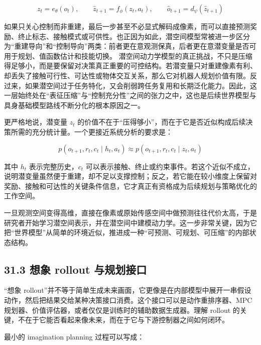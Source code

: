 \begingroup
\scriptsize
\begin{equation*}
z_t = e_\theta(o_t), \qquad \hat{z}_{t+1} = f_\phi(z_t, a_t), \qquad \hat{o}_{t+1} = d_\psi(\hat{z}_{t+1})
\end{equation*}
\endgroup

如果只关心控制而非重建，最后一步甚至不必显式解码成像素，而可以直接预测奖励、终止标志、接触模式或可供性。也正因为如此，潜空间模型常被进一步区分为“重建导向”和“控制导向”两类：前者更在意观测保真，后者更在意潜变量是否可用于规划、值函数估计和技能切换。 潜空间动力学模型的真正挑战，不只是压缩得足够小，而是要保留对决策真正重要的可控结构。若潜变量只对重建像素有利、却丢失了接触可行性、可达性或物体交互关系，那么它对机器人规划价值有限。反过来，如果潜空间过于任务特化，又会削弱跨任务复用和长期泛化能力。因此，这一层始终处在“表征压缩”与“控制充分性”之间的张力之中，这也是后续世界模型与具身基础模型路线不断分化的根本原因之一。

更严格地说，潜变量 \(z_t\) 的价值不在于“压得够小”，而在于它是否近似构成后续决策所需的充分统计量。一个更接近系统分析的要求是：

\begingroup
\footnotesize
\begin{equation*}
p(o_{t+1}, r_t, c_t \mid h_t, a_t) \approx p(o_{t+1}, r_t, c_t \mid z_t, a_t)
\end{equation*}
\endgroup

其中 \(h_t\) 表示完整历史，\(c_t\) 可以表示接触、终止或约束事件。若这个近似不成立，说明潜变量虽然便于重建，却不足以支撑控制；反之，若它能在较小维度上保留对奖励、接触和可达性的关键条件信息，它才真正有资格成为后续规划与策略优化的工作空间。

一旦观测空间变得高维，直接在像素或原始传感空间中做预测往往代价太高，于是研究者开始学习潜空间表示，并在潜空间中建模动力学。这一步非常关键，因为它把“世界模型”从简单的环境近似，推进成一种“可预测、可规划、可压缩”的内部状态结构。

\subsection*{31.3 想象 rollout 与规划接口}


“想象 rollout”并不等于简单生成未来画面，它更像是在内部模型中展开一串假设动作，然后把结果交给某种决策接口消费。这个接口可以是动作重排序器、MPC 规划器、价值评估器，或者仅仅是训练时的辅助数据生成器。理解 rollout 的关键，不在于它能否看起来像未来，而在于它与下游控制器之间如何闭环。

最小的 imagination planning 过程可以写成：

